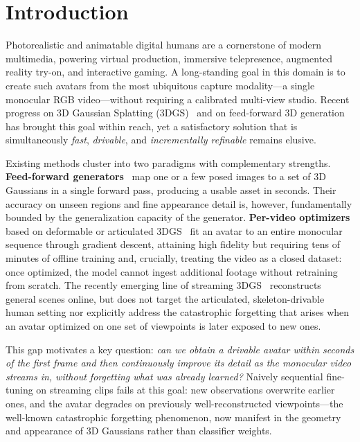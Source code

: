 \section{Introduction}\label{sec:intro}

Photorealistic and animatable digital humans are a cornerstone of modern
multimedia, powering virtual production, immersive telepresence, augmented
reality try-on, and interactive gaming. A long-standing goal in this domain
is to create such avatars from the most ubiquitous capture modality---a
single monocular RGB video---without requiring a calibrated multi-view
studio. Recent progress on 3D Gaussian Splatting (3DGS)~\cite{kerbl3Dgaussians}
and on feed-forward 3D generation has brought this goal within reach, yet a
satisfactory solution that is simultaneously \emph{fast}, \emph{drivable},
and \emph{incrementally refinable} remains elusive.

Existing methods cluster into two paradigms with complementary strengths.
\textbf{Feed-forward generators}~\cite{yan2026triposplat,tang2024lgm,zhang2024gslrm,pan2024humansplat,qiu2025lhm}
map one or a few posed images to a set of 3D Gaussians in a single forward
pass, producing a usable asset in seconds. Their accuracy on unseen regions
and fine appearance detail is, however, fundamentally bounded by the
generalization capacity of the generator. \textbf{Per-video optimizers}
based on deformable or articulated 3DGS~\cite{hu2024gauhuman,hu2024gaussianavatar,qian2024gsavatar,kocabas2024hugs}
fit an avatar to an entire monocular sequence through gradient descent,
attaining high fidelity but requiring tens of minutes of offline training
and, crucially, treating the video as a closed dataset: once optimized, the
model cannot ingest additional footage without retraining from scratch.
The recently emerging line of streaming 3DGS~\cite{wu2025streamsplat,li2025streamgs,girish2024queen}
reconstructs general scenes online, but does not target the articulated,
skeleton-drivable human setting nor explicitly address the catastrophic
forgetting that arises when an avatar optimized on one set of viewpoints is
later exposed to new ones.

This gap motivates a key question: \emph{can we obtain a drivable avatar
within seconds of the first frame and then continuously improve its detail
as the monocular video streams in, without forgetting what was already
learned?} Naively sequential fine-tuning on streaming clips fails at this
goal: new observations overwrite earlier ones, and the avatar degrades on
previously well-reconstructed viewpoints---the well-known catastrophic
forgetting phenomenon, now manifest in the geometry and appearance of 3D
Gaussians rather than classifier weights.

